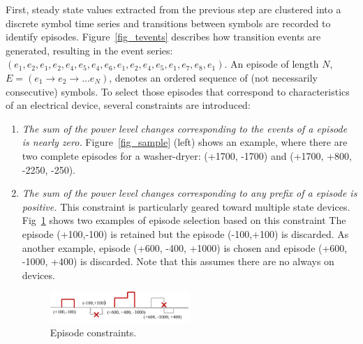 First, steady
state values extracted from the previous
step are clustered into a discrete symbol time series and transitions between
symbols are recorded to identify episodes.
Figure~\ref{fig_tevents} describes how transition events are generated,
resulting in the event series:
$(e_1, e_2, e_1, e_2, e_4, e_5, e_4, e_6, e_1, e_2, e_4, e_5, e_1, e_7, e_8, e_1)$.
An episode of length $N$,
$E=(e_1 \rightarrow e_2 \rightarrow...e_N)$,
denotes an ordered sequence of (not necessarily consecutive) symbols.
To select those episodes that correspond to characteristics of an electrical device,
several constraints are introduced:
\begin{enumerate}
\item {\it The sum of the power level changes corresponding to
the events of a episode is nearly zero.}
Figure~\ref{fig_sample} (left) shows an example, where there
are two complete episodes for a washer-dryer:
(+1700, -1700) and (+1700, +800, -2250, -250).
\item {\it The sum of the power level changes corresponding to any
prefix of a episode is positive.} This constraint is particularly geared
toward multiple state devices.
Fig~\ref{fig_cst} shows two examples of episode selection
based on this constraint
The episode (+100,-100) is retained but the episode (-100,+100) is discarded.
As another example, episode (+600, -400, +1000)
is chosen and episode (+600, -1000, +400) is discarded. Note that this assumes
there are no always on devices.

\begin{figure}[!hbtp]
\centering
\includegraphics[width=0.5\textwidth]{disaggfigs/cst.png}
\caption{Episode constraints.}
\label{fig_cst}
\end{figure}



\end{enumerate}

